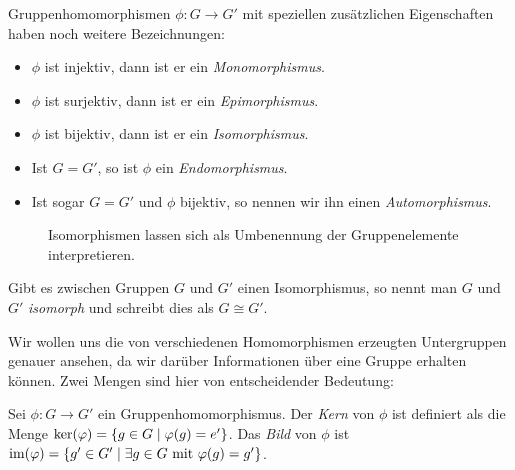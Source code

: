 {Gruppenhomomorphismen $\phi \colon G \rightarrow G'$ mit speziellen zusätzlichen Eigenschaften haben noch weitere Bezeichnungen:
\begin{itemize}
  \item $\phi$ ist injektiv, dann ist er ein \emph{Monomorphismus}.
  \item $\phi$ ist surjektiv, dann ist er ein \emph{Epimorphismus}.
  \item $\phi$ ist bijektiv, dann ist er ein \emph{Isomorphismus}.
  \item Ist $G = G'$, so ist $\phi$ ein \emph{Endomorphismus}.
  \item Ist sogar $G = G'$ und $\phi$ bijektiv, so nennen wir ihn einen \emph{Automorphismus}.
\end{itemize}

\begin{figure}[ht]
  \centering
  \caption{Isomorphismen lassen sich als Umbenennung der Gruppenelemente interpretieren.}
\end{figure}

Gibt es zwischen Gruppen $G$ und $G'$ einen Isomorphismus, so nennt man $G$ und $G'$ \emph{isomorph} und schreibt dies als $G \cong G'$.

Wir wollen uns die von verschiedenen Homomorphismen erzeugten Untergruppen genauer ansehen, da wir darüber Informationen über eine Gruppe erhalten können. Zwei Mengen sind hier von entscheidender Bedeutung:

\begin{definition}
  Sei $\phi \colon G \rightarrow G'$ ein Gruppenhomomorphismus. Der \emph{Kern} von $\phi$ ist definiert als die Menge $\ker(\phi) = \left\{ g \in G \suchthat \phi(g)=e' \right\}$. Das \emph{Bild} von $\phi$ ist $\img(\phi) = \left\{ g' \in G' \suchthat \exists g \in G \text{ mit } \phi(g)=g'\right\}$.
\end{definition}

}
